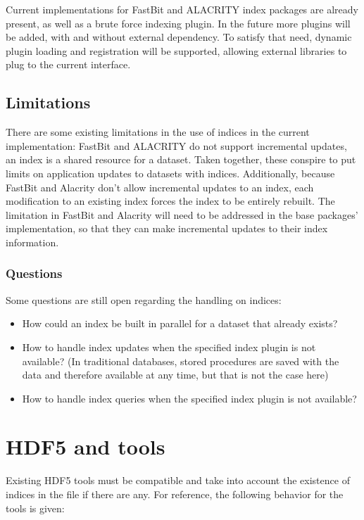 \documentclass[letterpaper,hyper]{THG_RFC}
\begin{document}
Current implementations for FastBit and ALACRITY index packages are already
present, as well as a brute force indexing plugin. In the future more plugins
will be added, with and without external dependency.
To satisfy that need, dynamic plugin loading and registration will be supported,
allowing external libraries to plug to the current interface.

\subsection{Limitations}

There are some existing limitations in the use of indices in the current
implementation: FastBit and
ALACRITY do not support incremental updates, an index is a shared resource for
a dataset. Taken together, these conspire to put limits on application updates
to datasets with indices.
Additionally, because FastBit and Alacrity don't allow incremental updates to
an index, each modification to an existing index forces the index to be entirely
rebuilt. The limitation in FastBit and Alacrity will need to be addressed in
the base packages' implementation, so that they can make incremental updates
to their index information.

\subsubsection*{Questions}
Some questions are still open regarding the handling on indices:
\begin{itemize}
\item How could an index be built in parallel for a dataset that already exists?
\item How to handle index updates when the specified index plugin is not available?
(In traditional databases, stored procedures are saved with the data and
therefore available at any time, but that is not the case here)
\item How to handle index queries when the specified index plugin is not
available?
\end{itemize}

\section{HDF5 and tools}

Existing HDF5 tools must be compatible and take into account the existence of
indices in the file if there are any. For reference, the following behavior for
the tools is given:
\end{document}
